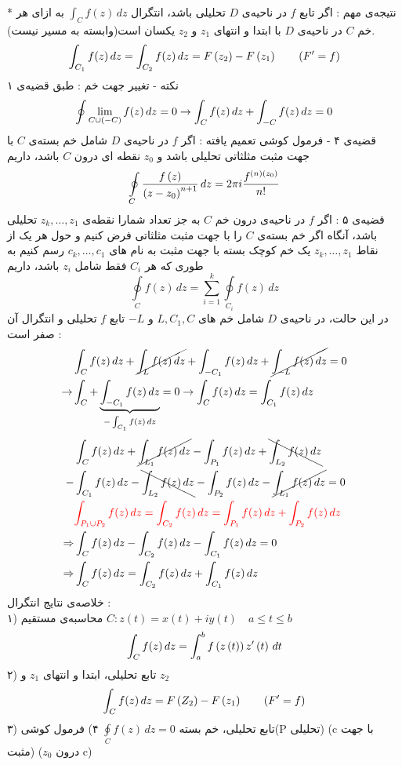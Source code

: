 * نتیجه‌ی مهم : اگر تابع
$f$
در ناحیه‌ی
$D$
تحلیلی باشد، انتگرال
$\int_Cf(z)\,dz$
به ازای هر خم
$C$
در ناحیه‌ی
$D$
با ابتدا و انتهای
$z_1$
و
$z_2$
یکسان است(وابسته به مسیر نیست).
\[
\int_{C_1}f(z)\,dz=\int_{C_2}f(z)\,dz=F\left(z_2\right)-F\left(z_1\right) \qquad(F^\prime=f)
\]
نکته - تغییر جهت خم : طبق قضیه‌ی ۱
\[
\oint\lim\limits_{C\cup\left(-C\right)}f(z)\,dz=0\rightarrow\int_Cf(z)\,dz+\int_{-C}f(z)\,dz=0
\]
قضیه‌ی ۴ - فرمول کوشی تعمیم یافته : اگر
$f$
در ناحیه‌ی
$D$
شامل خم بسته‌ی
$C$
با جهت مثبت مثلثاتی تحلیلی باشد و
$z_0$
نقطه ای درون
$C$
باشد، داریم
\[
\oint\limits_C\frac{f\left(z\right)}{\left(z-z_0\right)^{n+1}}\,dz=2\pi i\frac{f^{(n)\left(z_0\right)}}{n!}
\]
قضیه‌ی ۵ :‌ اگر
$f$
در ناحیه‌ی درون خم
$C$
به جز تعداد شمارا نقطه‌ی
$z_k,\dots,z_1$
تحلیلی باشد، آنگاه اگر خم بسته‌ی
$C$
را با جهت مثبت مثلثاتی فرض کنیم و حول هر یک از نقاط
$z_k,\dots,z_1$
یک خم کوچک بسته با جهت مثبت به نام های
$c_k,\dots,c_1$
رسم کنیم به طوری که هر
$C_i$
فقط شامل
$z_i$
باشد، داریم
\[
\oint\limits_Cf(z)\,dz=\sum_{i=1}^k \oint\limits_{C_i}f(z)\,dz
\]
در این حالت،
 در ناحیه‌ی
$D$
شامل خم های
$L,C_1,C$
و
$-L$
تابع
$f$
تحلیلی و انتگرال آن صفر است :
\[\begin{aligned}
&\int_Cf(z)\,dz+\cancel{\int_Lf(z)\,dz}+\int_{-C_1}f(z)\,dz+\cancel{\int_{-L}f(z)\,dz}=0
\\ \rightarrow&
\int_C+\underbrace{\int_{-C_1}f(z)\,dz}_{-\int_{C_1}f(z)\,dz}=0\rightarrow\int_{C}f(z)\,dz=\int_{C_1}f(z)\,dz
\end{aligned}\]
\[\begin{aligned}
	&\int_Cf(z)\,dz+\cancel{\int_{L_1}f(z)\,dz}-\int_{P_1}f(z)\,dz+
	\bcancel{\int_{L_2}f(z)\,dz}
	\\ -&
	\int_{C_1}f(z)\,dz-\bcancel{\int_{L_2}f(z)\,dz}-\int_{P_2}f(z)\,dz-\cancel{\int_{L_1}f(z)\,dz}=0
	\\ &
	\textcolor{red}{\int_{P_1\cup P_2}f(z)\,dz=\int_{C_2}f(z)\,dz=\int_{P_1}f(z)\,dz+\int_{P_2}f(z)\,dz}
	\\ \Rightarrow &
	\int_C f(z)\,dz-\int_{C_2}f(z)\,dz-\int_{C_1}f(z)\,dz=0
	\\ \Rightarrow &
	\int_C f(z)\,dz=\int_{C_2}f(z)\,dz+\int_{C_1}f(z)\,dz
\end{aligned}\]
خلاصه‌ی نتایج انتگرال :\\
۱) محاسبه‌ی مستقیم \hfill
$C : z(t)=x(t)+iy(t) \quad a\le t \le b$
$$\int_Cf(z)\,dz=\int_a^bf\left(z\left(t\right)\right)z^\prime\left(t\right)\,dt$$
۲) تابع تحلیلی، ابتدا و انتهای
$z_1$
و
$z_2$
\[
\int_Cf(z)\,dz=F\left(Z_2\right)-F\left(z_1\right)\qquad(F^\prime=f)
\]
۳) تابع تحلیلی، خم بسته \hfill
$\oint\limits_Cf(z)\,dz=0$
۴) فرمول کوشی(P تحلیلی) (c با جهت مثبت) ($z_0$ درون c)
